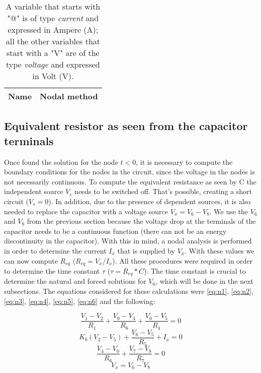 \begin{table}[H]

  \centering 
  \begin{tabular}{|l|r|}
    \hline    
    {\bf Name} & {\bf Nodal method}\\ \hline
    
  \end{tabular}
  \vspace{10px}
  \caption{A variable that starts with "@" is of type {\em current}
    and expressed in Ampere (A); all the other variables that start with a "V" are of the type {\it voltage} and expressed in
    Volt (V).}
  \label{tab:theoretical}
  
\end{table}


\subsection{Equivalent resistor as seen from the capacitor terminals}
Once found the solution for the node $t<0$, it is necessary to compute the boundary conditions for the nodes in the circuit, since the voltage in the nodes is not necessarily continuous.
To compute the equivalent resistance as seen by C the independent source $V_c$ needs to be switched off. That's possible, creating a short circuit ($V_s=0$). In addition, due to the presence of dependent sources, it is also needed to replace the capacitor with a voltage source $V_x=V_6-V_8$. We use the $V_6$ and $V_8$ from the previous section because the voltage drop at the terminals of the capacitor needs to be a continuous function (there can not be an energy discontinuity in the capacitor). With this in mind, a nodal analysis is performed in order to determine the current $I_x$ that is supplied by $V_x$. With these values we can now compute $R_{eq}$ ($R_{eq}=V_x/I_x$). All these procedures were required in order to determine the time constant $\tau$ ($\tau=R_{eq}*C$). The time constant is crucial to determine the natural and forced solutions for $V_6$, which will be done in the next subsections. The equations considered for these calculations were \ref{eq:n1}, \ref{eq:n2}, \ref{eq:n3}, \ref{eq:n4}, \ref{eq:n5}, \ref{eq:n6} and the following:


\begin {equation}
	\frac{V_1-V_2}{R_1} + \frac{V_0-V_4}{R_6} + \frac{V_0-V_5}{R_4} = 0
	\label{eq:eq7}
\end{equation}
\begin {equation}
	K_b(V_2-V_5) + \frac{V_6-V_5}{R_5} + I_x  = 0
	\label{eq:eq8}
\end{equation}
\begin {equation}
	\frac{V_4-V_0}{R_6} + \frac{V_7 - V_8}{R_7} = 0
	\label{eq:eq9}
\end{equation}
\begin {equation}
	V_x = V_6 - V_8
	\label{eq:eq10}
\end{equation}
\newpage

